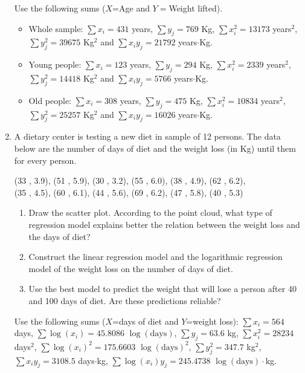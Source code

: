 \begin{enumerate}[leftmargin=*,resume]
Use the following sums ($X$=Age and $Y=$Weight lifted).
\begin{itemize}[label=--]
\item Whole sample: $\sum x_i=431$ years, $\sum y_j=769$ Kg, $\sum x_i^2=13173$ years$^2$, $\sum y_j^2=39675$
Kg$^2$ and $\sum x_iy_j=21792$ years$\cdot$Kg.
\item Young people: $\sum x_i=123$ years, $\sum y_j=294$ Kg, $\sum x_i^2=2339$ years$^2$, $\sum y_j^2=14418$
Kg$^2$ and $\sum x_iy_j=5766$ years$\cdot$Kg.
\item Old people: $\sum x_i=308$ years, $\sum y_j=475$ Kg, $\sum x_i^2=10834$ years$^2$, $\sum y_j^2=25257$
Kg$^2$ and $\sum x_iy_j=16026$ years$\cdot$Kg.
\end{itemize}

\item A dietary center is testing a new diet in sample of 12 persons. 
The data below are the number of days of diet and the weight loss (in Kg) until them for every person.  
\begin{center}
(33 , 3.9), (51 , 5.9), (30 , 3.2), (55 , 6.0), (38 , 4.9), (62 , 6.2),\\
(35 , 4.5), (60 , 6.1), (44 , 5.6), (69 , 6.2), (47 , 5.8), (40 , 5.3)
\end{center}
\begin{enumerate}
\item Draw the scatter plot. According to the point cloud, what type of regression model explains better the relation
between the weight loss and the days of diet?
\item Construct the linear regression model and the logarithmic regression model of the weight loss on the number of days of diet.
\item Use the best model to predict the weight that will lose a person after 40 and 100 days of diet. 
Are these predictions reliable?
\end{enumerate}
Use the following sums ($X$=days of diet and $Y$=weight loss): $\sum x_i=564$ days, $\sum \log(x_i)=45.8086$
$\log(\mbox{days})$, $\sum y_j=63.6$ kg, $\sum x_i^2=28234$ days$^2$, $\sum \log(x_i)^2=175.6603$ $\log(\mbox{days})^2$, $\sum y_j^2=347.7$ kg$^2$, $\sum x_iy_j=3108.5$ days$\cdot$kg, $\sum \log(x_i)y_j=245.4738$ $\log(\mbox{days})\cdot$kg.


\end{enumerate}
